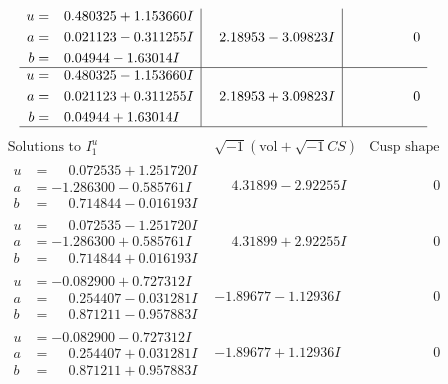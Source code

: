 \documentclass[1p]{elsarticle_modified}
\theoremstyle{definition}
\newcommand{\I}{\sqrt{-1}}
\begin{document}
$$\begin{array}{c|c|c}
\begin{aligned}
u &= \phantom{-}0.480325 + 1.153660 I \\
a &= \phantom{-}0.021123 - 0.311255 I \\
b &= \phantom{-}0.04944 - 1.63014 I\end{aligned}
 & \phantom{-}2.18953 - 3.09823 I & \phantom{-0.000000 } 0 \\ \hline\begin{aligned}
u &= \phantom{-}0.480325 - 1.153660 I \\
a &= \phantom{-}0.021123 + 0.311255 I \\
b &= \phantom{-}0.04944 + 1.63014 I\end{aligned}
 & \phantom{-}2.18953 + 3.09823 I & \phantom{-0.000000 } 0\\
 \hline 
 \end{array}$$\newpage$$\begin{array}{c|c|c}  
\text{Solutions to }I^u_{1}& \I (\text{vol} + \sqrt{-1}CS) & \text{Cusp shape}\\
 \hline 
\begin{aligned}
u &= \phantom{-}0.072535 + 1.251720 I \\
a &= -1.286300 - 0.585761 I \\
b &= \phantom{-}0.714844 - 0.016193 I\end{aligned}
 & \phantom{-}4.31899 - 2.92255 I & \phantom{-0.000000 } 0 \\ \hline\begin{aligned}
u &= \phantom{-}0.072535 - 1.251720 I \\
a &= -1.286300 + 0.585761 I \\
b &= \phantom{-}0.714844 + 0.016193 I\end{aligned}
 & \phantom{-}4.31899 + 2.92255 I & \phantom{-0.000000 } 0 \\ \hline\begin{aligned}
u &= -0.082900 + 0.727312 I \\
a &= \phantom{-}0.254407 - 0.031281 I \\
b &= \phantom{-}0.871211 - 0.957883 I\end{aligned}
 & -1.89677 - 1.12936 I & \phantom{-0.000000 } 0 \\ \hline\begin{aligned}
u &= -0.082900 - 0.727312 I \\
a &= \phantom{-}0.254407 + 0.031281 I \\
b &= \phantom{-}0.871211 + 0.957883 I\end{aligned}
 & -1.89677 + 1.12936 I & \phantom{-0.000000 } 0 \\ \hline\begin{aligned}

\end{aligned}
\end{array}$$
\end{document}
